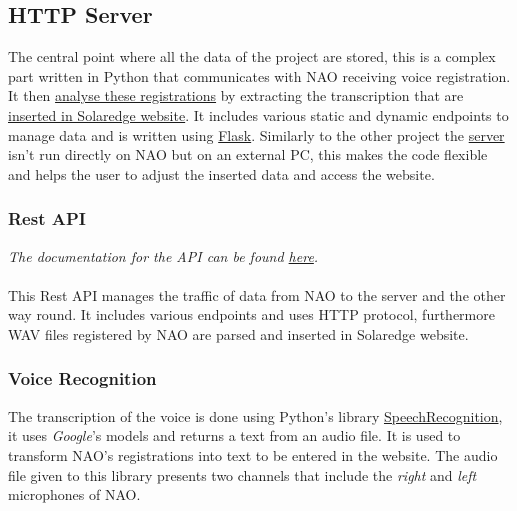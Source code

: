 \documentclass{optica-article}
\begin{document}
\vspace{12pt}
\subsection{HTTP Server}\label{sec:solaedge_server}
The central point where all the data of the project are stored, this is a complex part written in Python that communicates with NAO receiving voice registration. It then \hyperref[sec:solaredge_voice_recognition]{analyse these registrations} by extracting the transcription that are \hyperref[sec:solaredge_website_control]{inserted in Solaredge website}. It includes various static and dynamic endpoints to manage data and is written using \hyperref[https://flask.palletsprojects.com/en/2.2.x/]{Flask}. Similarly to the other project the \hyperref[sec:solaedge_server]{server} isn't run directly on NAO but on an external PC, this makes the code flexible and helps the user to adjust the inserted data and access the website.

\vspace{8pt}
\subsubsection{Rest API}\label{sec:solaredge_rest_api}
\textit{The documentation for the API can be found \hyperref[https://naonexus.notion.site/Solaredge-server-1bae2ae87b4d407b82f5a50bbfe3d87c]{here}.}\\
\\This Rest API manages the traffic of data from NAO to the server and the other way round. It includes various endpoints and uses HTTP protocol, furthermore WAV files registered by NAO are parsed and inserted in Solaredge website.

\vspace{8pt}
\subsubsection{Voice Recognition}\label{sec:solaredge_voice_recognition}
The transcription of the voice is done using Python's library \hyperref[https://pypi.org/project/SpeechRecognition/]{SpeechRecognition}, it uses \emph{Google}'s models and returns a text from an audio file. It is used to transform NAO's registrations into text to be entered in the website. The audio file given to this library presents two channels that include the \emph{right} and \emph{left} microphones of NAO.

\vspace{8pt}
\end{document}
